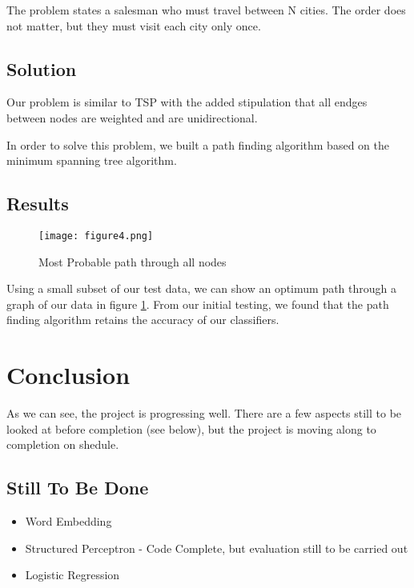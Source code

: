 \documentclass[12pt]{report}
\begin{document}
The problem states a salesman who must travel between N  cities. The order does not matter,
but they must visit each city only once.

\section{Solution}
Our problem is similar to TSP with the added stipulation that all endges between nodes are weighted
and are unidirectional.

In order to solve this problem, we built a path finding algorithm based on the minimum spanning tree
algorithm.


\section{Results}
\begin{figure}[h]
  \centering
  \texttt{[image: figure4.png]}
  \label{figure:graph}
  \caption{Most Probable path through all nodes}
\end{figure}

Using a small subset of our test data, we can show an optimum path through a graph of our data in
figure \ref{figure:graph}. From our initial testing, we found that the path finding algorithm retains
the accuracy of our classifiers.

\chapter{Conclusion}
As we can see, the project is progressing well.
There are a few aspects still to be looked at before completion (see below), but the project is moving
along to completion on shedule.


\section{Still To Be Done}
\begin{itemize}
\item Word Embedding
\item Structured Perceptron - Code Complete, but evaluation still to be carried out
\item Logistic Regression
  \end{itemize}

{}
\end{document}

